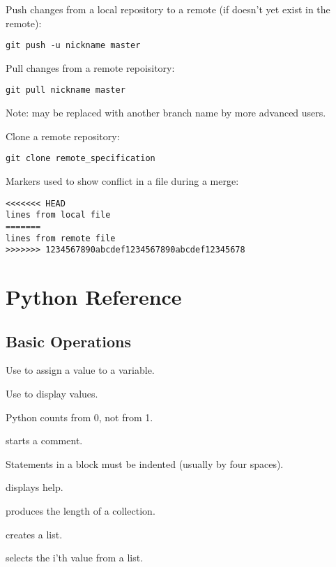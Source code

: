 Push changes from a local repository to a remote (if 
doesn't yet exist in the remote):

\begin{Verbatim}
git push -u nickname master
\end{Verbatim}

Pull changes from a remote repoisitory:

\begin{Verbatim}
git pull nickname master
\end{Verbatim}

Note:  may be replaced with another branch name by more
advanced users.

Clone a remote repository:

\begin{Verbatim}
git clone remote_specification
\end{Verbatim}

Markers used to show conflict in a file during a merge:

\begin{Verbatim}
<<<<<<< HEAD
lines from local file
=======
lines from remote file
>>>>>>> 1234567890abcdef1234567890abcdef12345678
\end{Verbatim}

\section{Python Reference}

\subsection*{Basic Operations}

\begin{swcitemize}
\item
  Use  to assign a value to a variable.
\item
  Use  to display values.
\item
  Python counts from 0, not from 1.
\item
  \code{\#} starts a comment.
\item
  Statements in a block must be indented (usually by four spaces).
\item
   displays help.
\item
   produces the length of a collection.
\item
   creates a list.
\item
   selects the i'th value from a list.
\end{swcitemize}

